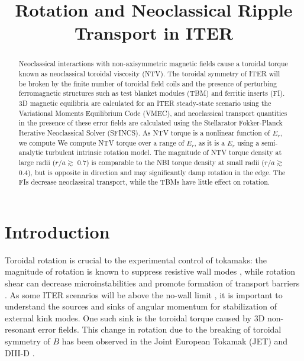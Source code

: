 \documentclass{article}
\title{Rotation and Neoclassical Ripple Transport in ITER}
\begin{document}
\maketitle

\begin{abstract}

Neoclassical interactions with non-axisymmetric magnetic fields cause a toroidal torque known as neoclassical toroidal viscosity (NTV). The toroidal symmetry of ITER will be broken by the finite number of toroidal field coils and the presence of perturbing ferromagnetic structures such as test blanket modules (TBM) and ferritic inserts (FI). 3D magnetic equilibria are calculated for an ITER steady-state scenario using the Variational Moments Equilibrium Code (VMEC), and neoclassical transport quantities in the presence of these error fields are calculated using the Stellarator Fokker-Planck Iterative Neoclassical Solver (SFINCS). As NTV torque is a nonlinear function of $E_r$, we compute 
We compute NTV torque over a range of $E_r$, as it is a  $E_r$ using a semi-analytic turbulent intrinsic rotation model. The magnitude of NTV torque density at large radii ($r/a \gtrsim$ 0.7) is comparable to the NBI torque density at small radii ($r/a \gtrsim$ 0.4), but is opposite in direction and may significantly damp rotation in the edge. The FIs decrease neoclassical transport, while the TBMs have little effect on rotation. 
\end{abstract}

\section{Introduction}

Toroidal rotation is crucial to the experimental control of tokamaks: the magnitude of rotation is known to suppress resistive wall modes \cite{Bondeson1994, Garofalo2002}, while rotation shear can decrease microinstabilities and promote formation of transport barriers \cite{Burrell1997, Terry2000}. As some ITER scenarios will be above the no-wall limit \cite{Liu2004}, it is important to understand the sources and sinks of angular momentum for stabilization of external kink modes. One such sink is the toroidal torque caused by 3D non-resonant error fields. This change in rotation due to the breaking of toroidal symmetry of $B$ has been observed in the Joint European Tokamak (JET) \cite{Lazzaro2002, DeVries2008} and DIII-D \cite{Garofalo2008}. 
\end{document}
